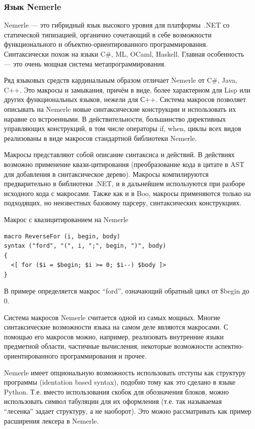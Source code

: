 \documentclass[a4paper,12pt,titlepage]{extarticle}
\begin{document}
\subsubsection*{Язык Nemerle}
Nemerle — это гибридный язык высокого уровня для платформы~.NET со статической
типизацией, органично сочетающий в себе возможности функционального и
объектно-ориентированного программирования. Синтаксически похож на языки C\#,
ML, OCaml, Haskell. Главная особенность --- это очень мощная система
метапрограммирования.

Ряд языковых средств кардинальным образом отличает Nemerle от C\#, Java, C++.
Это макросы и замыкания, причём в виде, более характерном для Lisp или других
функциональных языков, нежели для С++. Система макросов позволяет описывать на
Nemerle новые синтаксические конструкции и использовать их наравне со
встроенными. В действительности, большинство директивных управляющих
конструкций, в том числе операторы if, when, циклы всех видов реализованы в
виде макросов стандартной библиотеки Nemerle.

Макросы представляют собой описание синтаксиса и действий. В действиях
возможно применение квази-цитирования (преобразование кода в цитате в AST для
добавления в синтаксическое дерево). Макросы компилируются предварительно в
библиотеки .NET, и в дальнейшем используются при разборе исходного кода с
макросами. Также как и в Boo, макросы применяются только на подходящих, но
неизвестных базовому парсеру, синтаксических конструкциях.

Макрос с квазицитированием на Nemerle
\begin{verbatim}
macro ReverseFor (i, begin, body) 
syntax ("ford", "(", i, ";", begin, ")", body)
{
  <[ for ($i = $begin; $i >= 0; $i--) $body ]>
}
\end{verbatim}
В примере определяется макрос ``ford'', означающий обратный цикл от \$begin до
0.

Система макросов Nemerle считается одной из самых мощных. Многие
синтаксические возможности языка на самом деле являются макросами. С помощью
его макросов можно, например, реализовать внутренние языки предметной области,
частичные вычисления, некоторые возможности аспектно-ориентированного
программирования и прочее.

Nemerle имеет опциональную возможность использовать отступы как структуру
программы (identation based syntax), подобно тому как это сделано в языке
Python. Т.е. вместо использования скобок для обозначения блоков, можно
использовать символ табуляции для их оформления (т.е. так называемая
``лесенка'' задает структуру, а не наоборот). Это можно рассматривать как
пример расширения лексера в Nemerle.
\end{document}
